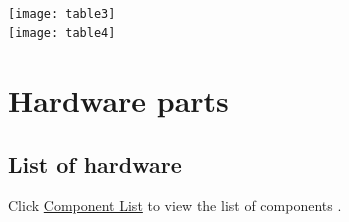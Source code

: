 \documentclass[a4paper,12pt,oneside]{book}
\begin{document}
\\[1cm]
\hfill\texttt{[image: table3]}
\\[3cm]
\hfill\texttt{[image: table4]}

\section{Hardware parts}
\subsection{List of hardware}

Click \href{https://drive.google.com/open?id=0ByLW6CS6kiaiMDBpdGxDMEZEV0U}{Component List} to view the list of components .
\end{document}
